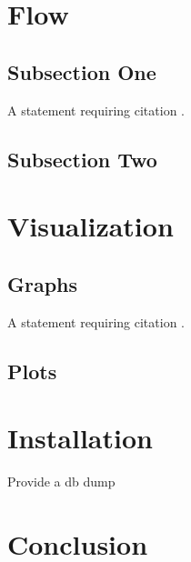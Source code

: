 \documentclass[twoside,twocolumn]{article}
\begin{document}
\blindtext %


\section{Flow}

\subsection{Subsection One}

A statement requiring citation \cite{Figueredo:2009dg}.
\blindtext %

\subsection{Subsection Two}

\blindtext %

\section{Visualization}

\subsection{Graphs}

A statement requiring citation \cite{Figueredo:2009dg}.
\blindtext %

\subsection{Plots}

\blindtext %


\section{Installation}
Provide a db dump


\section{Conclusion}

\end{document}
